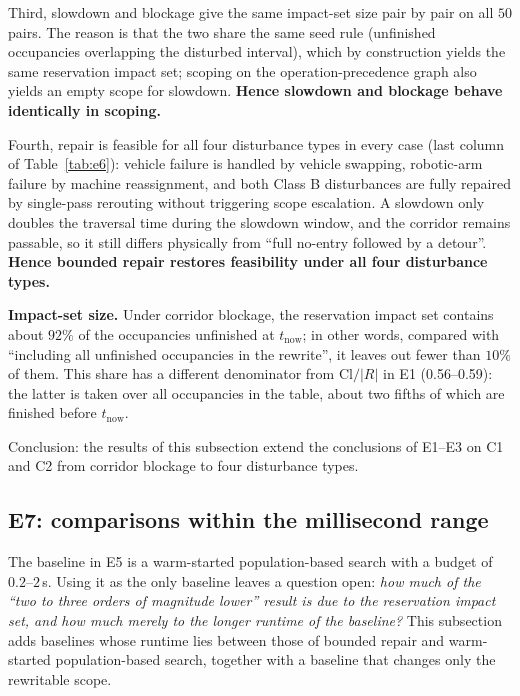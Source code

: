 \documentclass[manuscript,screen,review]{acmart}
\newcommand{\EoneCloLo}{0.56}
\newcommand{\EoneCloHi}{0.59}
\newcommand{\ClosureAliveFrac}{92\%}
\begin{document}
Third, slowdown and blockage give the same impact-set size pair by pair on all \(50\) pairs.
The reason is that the two share the same seed rule (unfinished occupancies overlapping the disturbed interval), which by construction yields the same reservation impact set;
scoping on the operation-precedence graph also yields an empty scope for slowdown.
\textbf{Hence slowdown and blockage behave identically in scoping.}

Fourth, repair is feasible for all four disturbance types in every case (last column of Table~\ref{tab:e6}): vehicle failure is handled by vehicle swapping, robotic-arm failure by machine reassignment,
and both Class B disturbances are fully repaired by single-pass rerouting without triggering scope escalation.
A slowdown only doubles the traversal time during the slowdown window, and the corridor remains passable,
so it still differs physically from ``full no-entry followed by a detour''.
\textbf{Hence bounded repair restores feasibility under all four disturbance types.}

\textbf{Impact-set size.} Under corridor blockage, the reservation impact set contains about \(\ClosureAliveFrac\) of the occupancies unfinished at \(t_{\mathrm{now}}\);
in other words, compared with ``including all unfinished occupancies in the rewrite'', it leaves out fewer than \(10\%\) of them.
This share has a different denominator from \(\mathrm{Cl}/|R|\) in E1 (\EoneCloLo--\EoneCloHi):
the latter is taken over all occupancies in the table, about two fifths of which are finished before \(t_{\mathrm{now}}\).

Conclusion: the results of this subsection extend the conclusions of E1--E3 on C1 and C2 from corridor blockage to four disturbance types.

\subsection{E7: comparisons within the millisecond range}
\label{sec:cheap}

The baseline in E5 is a warm-started population-based search with a budget of \(0.2\)--\(2\)\,s. Using it as the only baseline leaves a question open:
\emph{how much of the ``two to three orders of magnitude lower'' result is due to the reservation impact set, and how much merely to the longer runtime of the baseline?}
This subsection adds baselines whose runtime lies between those of bounded repair and warm-started population-based search, together with a baseline that changes only the rewritable scope.
\end{document}
